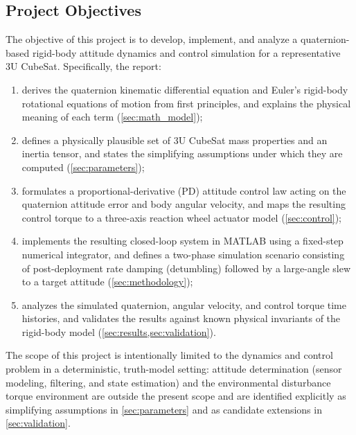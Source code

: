 \subsection{Project Objectives}
\label{sec:objectives}

The objective of this project is to develop, implement, and analyze a quaternion-based rigid-body attitude dynamics and control simulation for a representative 3U CubeSat. Specifically, the report:

\begin{enumerate}
    \item derives the quaternion kinematic differential equation and Euler's rigid-body rotational equations of motion from first principles, and explains the physical meaning of each term (\cref{sec:math_model});
    \item defines a physically plausible set of 3U CubeSat mass properties and an inertia tensor, and states the simplifying assumptions under which they are computed (\cref{sec:parameters});
    \item formulates a proportional-derivative (PD) attitude control law acting on the quaternion attitude error and body angular velocity, and maps the resulting control torque to a three-axis reaction wheel actuator model (\cref{sec:control});
    \item implements the resulting closed-loop system in MATLAB using a fixed-step numerical integrator, and defines a two-phase simulation scenario consisting of post-deployment rate damping (detumbling) followed by a large-angle slew to a target attitude (\cref{sec:methodology});
    \item analyzes the simulated quaternion, angular velocity, and control torque time histories, and validates the results against known physical invariants of the rigid-body model (\cref{sec:results,sec:validation}).
\end{enumerate}

The scope of this project is intentionally limited to the dynamics and control problem in a deterministic, truth-model setting: attitude determination (sensor modeling, filtering, and state estimation) and the environmental disturbance torque environment are outside the present scope and are identified explicitly as simplifying assumptions in \cref{sec:parameters} and as candidate extensions in \cref{sec:validation}.
